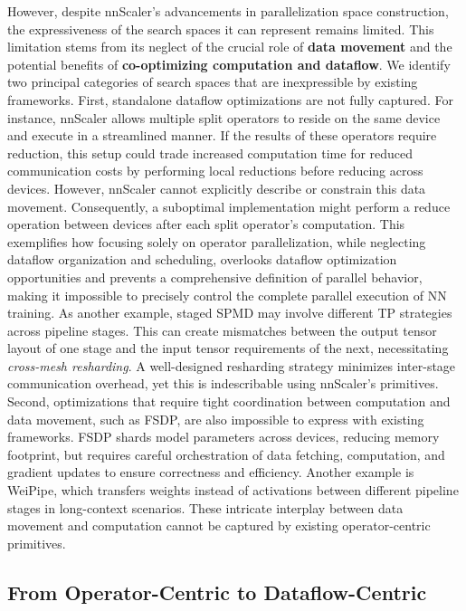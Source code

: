 However, despite nnScaler's advancements in parallelization space construction, the expressiveness of the search spaces it can represent remains limited. This limitation stems from its neglect of the crucial role of \textbf{data movement} and the potential benefits of \textbf{co-optimizing computation and dataflow}. We identify two principal categories of search spaces that are inexpressible by existing frameworks. First, standalone dataflow optimizations are not fully captured. For instance, nnScaler allows multiple split operators to reside on the same device and execute in a streamlined manner. If the results of these operators require reduction, this setup could trade increased computation time for reduced communication costs by performing local reductions before reducing across devices. However, nnScaler cannot explicitly describe or constrain this data movement. Consequently, a suboptimal implementation might perform a reduce operation between devices after each split operator's computation. This exemplifies how focusing solely on operator parallelization, while neglecting dataflow organization and scheduling, overlooks dataflow optimization opportunities and prevents a comprehensive definition of parallel behavior, making it impossible to precisely control the complete parallel execution of NN training. As another example, staged SPMD may involve different TP strategies across pipeline stages. This can create mismatches between the output tensor layout of one stage and the input tensor requirements of the next, necessitating \textit{cross-mesh resharding}. A well-designed resharding strategy minimizes inter-stage communication overhead, yet this is indescribable using nnScaler's primitives. Second, optimizations that require tight coordination between computation and data movement, such as FSDP, are also impossible to express with existing frameworks. FSDP shards model parameters across devices, reducing memory footprint, but requires careful orchestration of data fetching, computation, and gradient updates to ensure correctness and efficiency. Another example is WeiPipe, which transfers weights instead of activations between different pipeline stages in long-context scenarios. These intricate interplay between data movement and computation cannot be captured by existing operator-centric primitives.

\subsection{From Operator-Centric to Dataflow-Centric}

